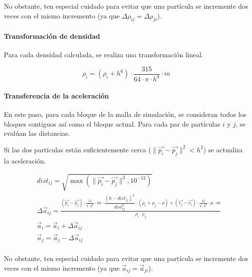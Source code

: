 No obstante, ten especial cuidado para evitar que una partícula se incremente dos
veces con el mismo incremento (ya que $\Delta \rho_{ij} = \Delta \rho_{ji}$).

\paragraph{Transformación de densidad}
Para cada densidad calculada, se realiza una transformación lineal.

\[
\rho_i = (\rho_i + h^6) \cdot \frac{315}{64 \cdot \pi \cdot h^9} \cdot m
\]

\paragraph{Transferencia de la aceleración}
En este paso, para cada bloque de la malla de simulación, se consideran todos 
los bloques contiguos así como el bloque actual. Para cada par de partículas
$i$ y $j$, se evalúan las distancias.

Si las dos partículas están suficientemente cerca 
($\|\vec{p_i} - \vec{p_j}\|^2 < h^2$) se actualiza la aceleración.

\[
\begin{split}
& dist_{ij} = \sqrt{\max(\|\vec{p_i} - \vec{p_j}\|^2, 10^{-12})} \\
& \Delta \vec{a}_{ij} = 
  \frac{
    (\vec{p_i} - \vec{p_j}) \cdot \frac{15}{\pi \cdot h^6} \cdot m \cdot 
    \dfrac{(h - dist_{ij})^2}{dist_{ij}^2} \cdot (\rho_i + \rho_j - \rho) +
    (\vec{v_j} - \vec{v_i}) \cdot \frac{45}{\pi \cdot h^6} \cdot \mu \cdot m
  }{
    \rho_i \cdot \rho_j    
  } \\
& \vec{a}_i = \vec{a}_i + \Delta \vec{a}_{ij}\\
& \vec{a}_j = \vec{a}_j - \Delta \vec{a}_{ij}\\
\end{split}
\]

No obstante, ten especial cuidado para evitar que una partícula se incremente dos
veces con el mismo incremento (ya que $\vec{a}_{ij} = \vec{a}_{ji}$).
